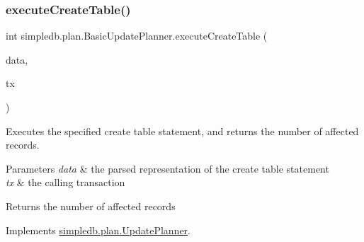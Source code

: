 \mbox{\label{classsimpledb_1_1plan_1_1BasicUpdatePlanner_ad29eefdb27d7f1c40de1af9031abc5b8}} 
\subsubsection{\texorpdfstring{execute\+Create\+Table()}{executeCreateTable()}}
{\footnotesize\ttfamily int simpledb.\+plan.\+Basic\+Update\+Planner.\+execute\+Create\+Table (\begin{DoxyParamCaption}\item[{\hyperlink{classsimpledb_1_1parse_1_1CreateTableData}{Create\+Table\+Data}}]{data,  }\item[{\hyperlink{classsimpledb_1_1tx_1_1Transaction}{Transaction}}]{tx }\end{DoxyParamCaption})\hspace{0.3cm}{\ttfamily [inline]}}

Executes the specified create table statement, and returns the number of affected records. 
\begin{DoxyParams}{Parameters}
{\em data} & the parsed representation of the create table statement \\
\hline
{\em tx} & the calling transaction \\
\hline
\end{DoxyParams}
\begin{DoxyReturn}{Returns}
the number of affected records 
\end{DoxyReturn}


Implements \hyperlink{interfacesimpledb_1_1plan_1_1UpdatePlanner_a44085c8b895a3da12486d3f59fde4a3a}{simpledb.\+plan.\+Update\+Planner}.

\mbox{\label{classsimpledb_1_1plan_1_1BasicUpdatePlanner_a2c43aed5eb272962bd57a66bdb200ce3}} 
